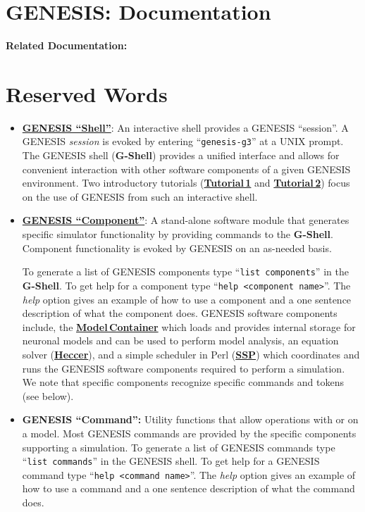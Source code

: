 \documentclass[12pt]{article}
\begin{document}
\section*{GENESIS: Documentation}

{\bf Related Documentation:}

\section*{Reserved Words}

\begin{itemize}

\item \href{../gshell/gshell.tex}{\bf GENESIS ``Shell''}: An interactive shell provides a GENESIS ``session''. A GENESIS  {\it session} is evoked by entering ``{\tt genesis-g3}'' at a UNIX prompt. The GENESIS shell ({\bf G-Shell}) provides a unified interface and allows for convenient interaction with other software components of a given GENESIS environment.  Two introductory tutorials (\href{../tutorial1/tutorial1.tex}{\bf Tutorial\,1} and \href{../tutorial2/tutorial2.tex}{\bf Tutorial\,2}) focus on the use of GENESIS from such an interactive shell.

\item \href{./genesis-components/genesis-components.tex}{\bf GENESIS ``Component''}:  A stand-alone software module that generates specific simulator functionality by providing commands to the {\bf G-Shell}. Component functionality is evoked by GENESIS on an as-needed basis.

To generate a list of GENESIS components type ``{\tt list components}'' in the {\bf G-Shell}. To get help for a component type ``{\tt help <component name>}''. The {\it help} option gives an example of how to use a component and a one sentence description of what the component does. GENESIS software components include, the \href{../model-container/model-container.tex}{\bf Model\,Container} which loads and provides internal storage for neuronal models and can be used to perform model analysis, an equation solver (\href{../heccer/heccer.tex}{\bf Heccer}), and a simple scheduler in Perl (\href{../ssp/ssp.tex}{\bf SSP}) which coordinates and runs the GENESIS software components required to perform a simulation. We note that specific components recognize specific commands and tokens (see below).

\item {\bf GENESIS ``Command'':} Utility functions that allow operations with or on a model. Most GENESIS commands are provided by the specific components supporting a simulation. To generate a list of GENESIS commands type ``{\tt list commands}'' in the GENESIS shell. To get help for a GENESIS command type ``{\tt help <command name>}''. The {\it help} option gives an example of how to use a command and a one sentence description of what the command does.


\end{itemize}
\end{document}
